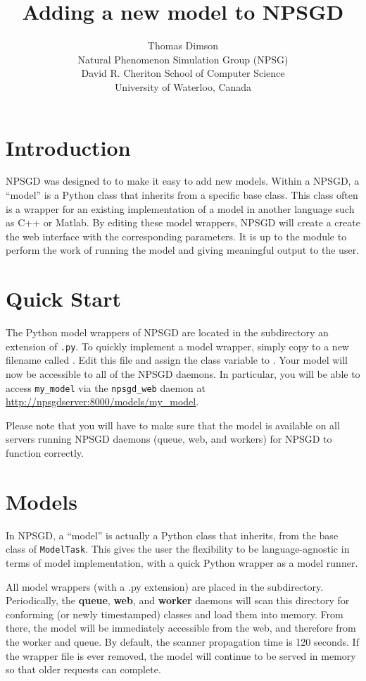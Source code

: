 \documentclass{article}
\title{Adding a new model to NPSGD}
\author{Thomas Dimson\\Natural Phenomenon Simulation Group (NPSG)\\David R. Cheriton School of Computer Science\\University of Waterloo, Canada}
\newcommand{\mclass}[1]{\sloppy\texttt{#1}}
\begin{document}
\maketitle
\tableofcontents
\newpage

\section{Introduction}
NPSGD was designed to to make it easy to add new models. Within a NPSGD, a
``model'' is a Python class that inherits from a specific
base class. This class often is a wrapper for an existing implementation of a
model in another language such as C++ or Matlab. By editing these model wrappers, NPSGD
will create a create the web interface with the corresponding parameters. It is up to the
module to perform the work of running the model and giving meaningful output to
the user.

\section{Quick Start}
The Python model wrappers of NPSGD are located in the 
subdirectory an extension of \texttt{.py}. To quickly implement a model wrapper,
simply copy  to a
new filename called . Edit this file and assign the
 class variable to . Your model will now be
accessible to all of the NPSGD daemons. In particular, you will be able to
access \texttt{my\_model} via the \texttt{npsgd\_web} daemon at 
\url{http://npsgdserver:8000/models/my_model}.

Please note that you will have to make sure that the model is available on all
servers running NPSGD daemons (queue, web, and workers) for NPSGD to function
correctly.

\section{Models}
In NPSGD, a ``model'' is actually a Python class that inherits, 
from the base class of \mclass{ModelTask}. This gives the user the
flexibility to be language-agnostic in terms of model implementation, with a
quick Python wrapper as a model runner.

All model wrappers (with a .py extension) are placed in the  subdirectory.
Periodically, the \textbf{queue}, \textbf{web},
and \textbf{worker} daemons will scan this directory for conforming (or newly
timestamped) classes and load them into memory. From there, the model will be
immediately accessible from the web, and therefore from the worker and queue. By
default, the scanner propagation time is 120 seconds. If the wrapper file is
ever removed, the model will continue to be served in memory so that older
requests can complete.
\end{document}
